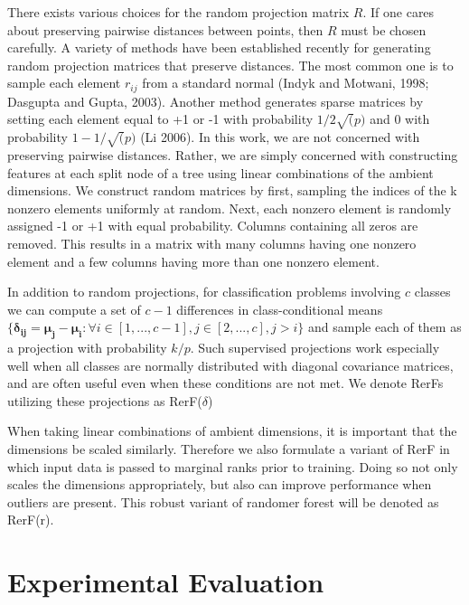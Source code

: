 \documentclass{article} %
\newcommand{\jovo}[1]{{\color{magenta}{\it jovo says: #1}}}
\begin{document}
There exists various choices for the random projection matrix $R$. If one cares about preserving pairwise distances between points, then $R$ must be chosen carefully. A variety of methods have been established recently for generating random projection matrices that preserve distances. The most common one is to sample each element $r_{ij}$ from a standard normal (Indyk and Motwani, 1998; Dasgupta and Gupta, 2003). Another method generates sparse matrices by setting each element equal to +1 or -1 with probability $1/2\sqrt(p)$ and 0 with probability $1 - 1/\sqrt(p)$ (Li 2006). In this work, we are not concerned with preserving pairwise distances. Rather, we are simply concerned with constructing features at each split node of a tree using linear combinations of the ambient dimensions. We construct random matrices by first, sampling the indices of the k nonzero elements uniformly at random. Next, each nonzero element is randomly assigned -1 or +1 with equal probability. Columns containing all zeros are removed. This results in a matrix with many columns having one nonzero element and a few columns having more than one nonzero element.

\jovo{we need proper pseudocode table, make it sufficient general such that all the variants under consideration are special cases.}

In addition to random projections, for classification problems involving $c$ classes we can compute a set of $c-1$ differences in class-conditional means $\{\boldsymbol{\delta_{ij}} = \boldsymbol{\mu_j} - \boldsymbol{\mu_i}: \forall i \in [1,...,c-1], j \in [2,...,c], j>i\}$ and sample each of them as a projection with probability $k/p$. Such supervised projections work especially well when all classes are normally distributed with diagonal covariance matrices, and are often useful even when these conditions are not met. We denote RerFs utilizing these projections as RerF($\delta$)

When taking linear combinations of ambient dimensions, it is important that the dimensions be scaled similarly. Therefore we also formulate a variant of RerF in which input data is passed to marginal ranks prior to training. Doing so not only scales the dimensions appropriately, but also can improve performance when outliers are present. This robust variant of randomer forest will be denoted as RerF(r).

\section{Experimental Evaluation}
\end{document}
